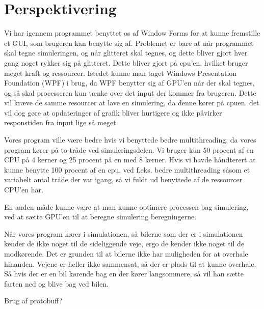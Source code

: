\chapter{Perspektivering}\label{Perspektivering}
Vi har igennem programmet benyttet os af Window Forms for at kunne fremstille et GUI, som brugeren kan benytte sig af. Problemet er bare at når programmet skal tegne simuleringen, og når glitteret skal tegnes, og dette bliver gjort hver gang noget rykker sig på glitteret. Dette bliver gjort på cpu'en, hvilket bruger meget kraft og ressourcer. Istedet kunne man taget Windows Presentation Foundation (WPF) i brug, da WPF benytter sig af GPU'en når der skal tegnes, og så skal processeren kun tænke over det input der kommer fra brugeren. Dette vil kræve de samme resourcer at lave en simulering, da denne kører på cpuen. det vil dog gøre at opdateringer af grafik bliver hurtigere og ikke påvirker responstiden fra input lige så meget.


\vspace{5mm}

Vores program ville være bedre hvis vi benyttede bedre multithreading, da vores program kører på to tråde ved simuleringsdelen. Vi bruger kun 50 procent af en CPU på 4 kerner og 25 procent på en med 8 kerner. Hvis vi havde håndterert at kunne benytte 100 procent af en cpu, ved f.eks. bedre multithreading såsom et variabelt antal tråde der var igang, så vi fuldt ud benyttede af de ressourcer CPU'en har.

\vspace{5mm}

En anden måde kunne være at man kunne optimere processen bag simulering, ved at sætte GPU'en til at beregne simulering beregningerne.

\vspace{5mm}

Når vores program kører i simulationen, så bilerne som der er i simulationen kender de ikke noget til de sideliggende veje, ergo de kender ikke noget til de modkørende. Det er grunden til at bilerne ikke har muligheden for at overhale hinanden. Vejene er heller ikke sammensat, så der er plads til at kunne overhale. Så hvis der er en bil kørende bag en der kører langsommere, så vil han sætte farten ned og blive bag ved bilen.

\vspace{5mm}

Brug af protobuff?